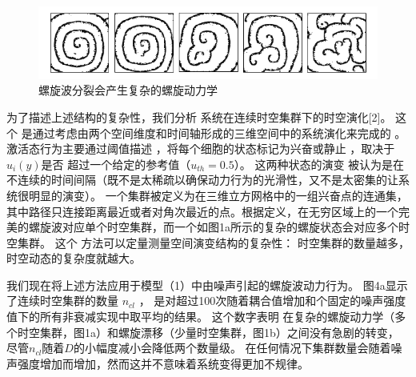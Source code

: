\documentclass[
    bachelor,
    nofont, %
    pdflinks,
    ]{xjtuthesis}
\begin{document}
\begin{figure}[!ht]
\centering
\includegraphics[scale=0.68]{fig3.png}
\caption{螺旋波分裂会产生复杂的螺旋动力学}
\end{figure}

\medskip
为了描述上述结构的复杂性，我们分析
系统在连续时空集群下的时空演化[2]。 这个
是通过考虑由两个空间维度和时间轴形成的三维空间中的系统演化来完成的
。 激活态行为主要通过阈值描述
，将每个细胞的状态标记为兴奋或静⽌ ，取决于$u_i(y)$是否
超过一个给定的参考值（$u_{th}= 0.5$）。 这两种状态的演变
被认为是在不连续的时间间隔（既不是太稀疏以确保动力行为的光滑性，又不是太密集的让系统很明显的演变）。 ⼀个集群被定义为在三维⽴⽅⽹格中的⼀组兴奋点的连通集，其中路径只连接距离最近或者对角次最近的点。根据定义，在无穷区域上的一个完美的螺旋波对应单个时空集群，而一个如图1a所⽰的复杂的螺旋状态会对应多个时空集群。 这个
⽅法可以定量测量空间演变结构的复杂性：
时空集群的数量越多，时空动态的复杂度就越⼤。

\medskip
我们现在将上述⽅法应⽤于模型（1）中由噪声引起的螺旋波动力行为。 图4a显⽰了连续时空集群的数量 $n_{cl}$ ，
是对超过100次随着耦合值增加和个固定的噪声强度值下的所有⾮衰减实现中取平均的结果。 这个数字表明
在复杂的螺旋动⼒学（多个时空集群，图1a）和螺旋漂移（少量时空集群，图1b）之间没有急剧的转变，尽管$n_{cl}$随着$D$的小幅度减小会降低两个数量级。 在任何情况下集群数量会随着噪声强度增加而增加，然⽽这并不意味着系统变得更加不规律。
\end{document}
